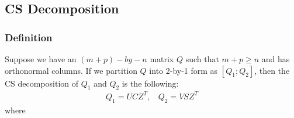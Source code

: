     
\subsection{CS Decomposition} \label{csd}

\subsubsection{Definition}
Suppose we have an $(m+p)-by-n$ matrix $Q$ such that $m+p \geq n$ and has orthonormal columns. If we partition $Q$ into 2-by-1 form as $[Q_1; Q_2]$, then the CS decomposition of $Q_1$ and $Q_2$ is the following:
    \begin{align}
        Q_1 = UCZ^T,\ \  \ \ Q_2 = VSZ^T
    \end{align}
where 
